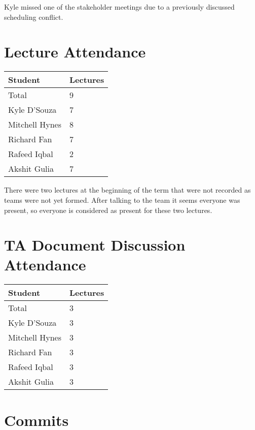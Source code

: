 \documentclass{article}
\begin{document}
Kyle missed one of the stakeholder meetings due to a previously
discussed scheduling conflict.

\section{Lecture Attendance}

\begin{table}[H]
  \centering
  \begin{tabular}{ll}
    \toprule
    \textbf{Student} & \textbf{Lectures}\\
    \midrule
    Total & 9\\
    Kyle D'Souza & 7\\
    Mitchell Hynes & 8\\
    Richard Fan & 7\\
    Rafeed Iqbal & 2\\
    Akshit Gulia & 7\\
    \bottomrule
  \end{tabular}
\end{table}

There were two lectures at the beginning of the term that were not
recorded as teams were not yet formed. After talking to the team it
seems everyone was present, so everyone is considered as present for
these two lectures.

\section{TA Document Discussion Attendance}

\begin{table}[H]
  \centering
  \begin{tabular}{ll}
    \toprule
    \textbf{Student} & \textbf{Lectures}\\
    \midrule
    Total & 3\\
    Kyle D'Souza & 3\\
    Mitchell Hynes & 3\\
    Richard Fan & 3\\
    Rafeed Iqbal & 3\\
    Akshit Gulia & 3\\
    \bottomrule
  \end{tabular}
\end{table}

\section{Commits}
\end{document}
